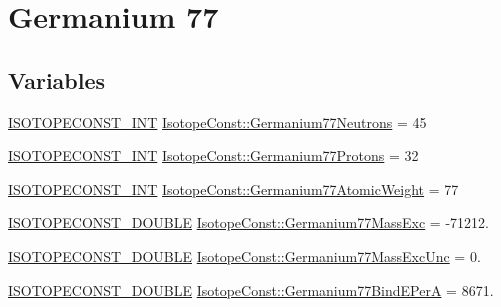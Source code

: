 \hypertarget{group___isotope_const-_germanium-_ge77}{}\section{Germanium 77}
\label{group___isotope_const-_germanium-_ge77}
\subsection*{Variables}
\begin{DoxyCompactItemize}
\item 
\mbox{\hyperlink{group___isotope_const-_macros_ga5f18360b3e99483a35c32d789e62621c}{I\+S\+O\+T\+O\+P\+E\+C\+O\+N\+S\+T\+\_\+\+I\+NT}} \mbox{\hyperlink{group___isotope_const-_germanium-_ge77_gae5d3ba1d787663f5b577ae950fe40257}{Isotope\+Const\+::\+Germanium77\+Neutrons}} = 45
\item 
\mbox{\hyperlink{group___isotope_const-_macros_ga5f18360b3e99483a35c32d789e62621c}{I\+S\+O\+T\+O\+P\+E\+C\+O\+N\+S\+T\+\_\+\+I\+NT}} \mbox{\hyperlink{group___isotope_const-_germanium-_ge77_ga46d856476302fe87d7235c4ce7920c14}{Isotope\+Const\+::\+Germanium77\+Protons}} = 32
\item 
\mbox{\hyperlink{group___isotope_const-_macros_ga5f18360b3e99483a35c32d789e62621c}{I\+S\+O\+T\+O\+P\+E\+C\+O\+N\+S\+T\+\_\+\+I\+NT}} \mbox{\hyperlink{group___isotope_const-_germanium-_ge77_gafd8621850a6c4e98f47337a06cd5b7d1}{Isotope\+Const\+::\+Germanium77\+Atomic\+Weight}} = 77
\item 
\mbox{\hyperlink{group___isotope_const-_macros_ga8f45a7272ce02c0b4c65c44636ed719a}{I\+S\+O\+T\+O\+P\+E\+C\+O\+N\+S\+T\+\_\+\+D\+O\+U\+B\+LE}} \mbox{\hyperlink{group___isotope_const-_germanium-_ge77_gae54523340b286aa07aac8a8cf4672cd5}{Isotope\+Const\+::\+Germanium77\+Mass\+Exc}} = -\/71212.
\item 
\mbox{\hyperlink{group___isotope_const-_macros_ga8f45a7272ce02c0b4c65c44636ed719a}{I\+S\+O\+T\+O\+P\+E\+C\+O\+N\+S\+T\+\_\+\+D\+O\+U\+B\+LE}} \mbox{\hyperlink{group___isotope_const-_germanium-_ge77_ga7aa01cc0e8b0d3c50373697de92b87f1}{Isotope\+Const\+::\+Germanium77\+Mass\+Exc\+Unc}} = 0.
\item 
\mbox{\hyperlink{group___isotope_const-_macros_ga8f45a7272ce02c0b4c65c44636ed719a}{I\+S\+O\+T\+O\+P\+E\+C\+O\+N\+S\+T\+\_\+\+D\+O\+U\+B\+LE}} \mbox{\hyperlink{group___isotope_const-_germanium-_ge77_gaae01efa037d061b017cb47c66ffcb9ca}{Isotope\+Const\+::\+Germanium77\+Bind\+E\+PerA}} = 8671.
\item 

\end{DoxyCompactItemize}
